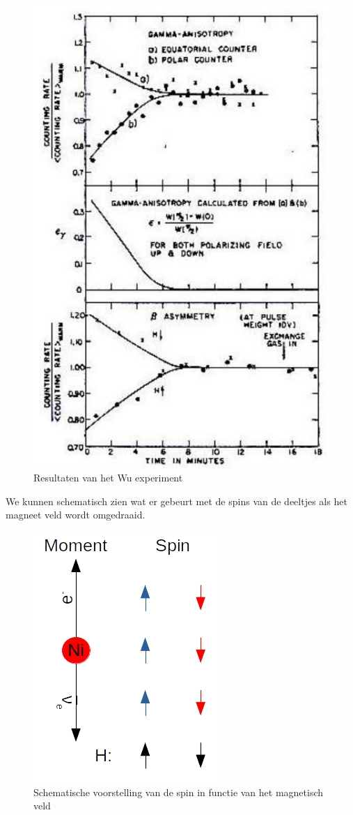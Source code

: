 \documentclass[../main.tex]{subfiles}
\begin{document}
\begin{figure}[h]
    \centering
    \includegraphics[width=0.6\linewidth]{parity_violation/wu_resultaten.png}
    \caption{Resultaten van het Wu experiment}%
    \label{fig:parity_violation/wu_resultaten}
\end{figure}

We kunnen schematisch zien wat er gebeurt met de spins van de deeltjes als het magneet veld wordt omgedraaid.

\begin{figure}[h]
    \centering
    \includegraphics[width=0.4\linewidth]{parity_violation/wu.jpg}
    \caption{Schematische voorstelling van de spin in functie van het magnetisch veld}%
    \label{fig:parity_violation/wu}
\end{figure}
\end{document}
